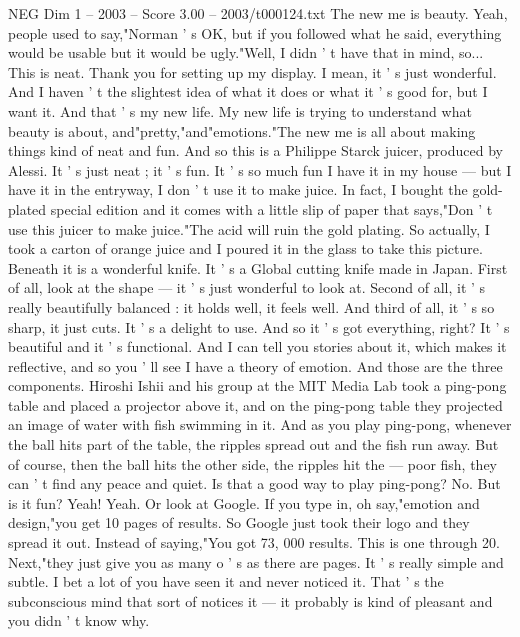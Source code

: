 \begin{textsample}{NEG Dim 1 – 2003 – Score 3.00 – 2003/t000124.txt}  \label{ex:f1_neg_079}
The new me is beauty.
Yeah, people used to say,"Norman ' s OK, but if you followed what he said, everything would be usable but it would be ugly."Well, I didn ' t have that in mind, so...
This is neat.
Thank you for setting up my display.
I mean, it ' s just wonderful.
And I haven ' t the slightest idea of what it does or what it ' s good for, but I want it.
And that ' s my new life.
My new life is trying to understand what beauty is about, and"pretty,"and"emotions."The new me is all about making things kind of neat and fun.
And so this is a Philippe Starck juicer, produced by Alessi.
It ' s just neat ; it ' s fun.
It ' s so much fun I have it in my house — but I have it in the entryway, I don ' t use it to make juice.
In fact, I bought the gold-plated special edition and it comes with a little slip of paper that says,"Don ' t use this juicer to make juice."The acid will ruin the gold plating.
So actually, I took a carton of orange juice and I poured it in the glass to take this picture.
Beneath it is a wonderful knife.
It ' s a Global cutting knife made in Japan.
First of all, look at the shape — it ' s just wonderful to look at.
Second of all, it ' s really beautifully balanced : it holds well, it feels well.
And third of all, it ' s so sharp, it just cuts.
It ' s a delight to use.
And so it ' s got everything, right?
It ' s beautiful and it ' s functional.
And I can tell you stories about it, which makes it reflective, and so you ' ll see I have a theory of emotion.
And those are the three components.
Hiroshi Ishii and his group at the MIT Media Lab took a ping-pong table and placed a projector above it, and on the ping-pong table they projected an image of water with fish swimming in it.
And as you play ping-pong, whenever the ball hits part of the table, the ripples spread out and the fish run away.
But of course, then the ball hits the other side, the ripples hit the — poor fish, they can ' t find any peace and quiet.
Is that a good way to play ping-pong?
No.
But is it fun?
Yeah!
Yeah.
Or look at Google.
If you type in, oh say,"emotion and design,"you get 10 pages of results.
So Google just took their logo and they spread it out.
Instead of saying,"You got 73, 000 results.
This is one through 20.
Next,"they just give you as many o ' s as there are pages.
It ' s really simple and subtle.
I bet a lot of you have seen it and never noticed it.
That ' s the subconscious mind that sort of notices it — it probably is kind of pleasant and you didn ' t know why.

\end{textsample}
